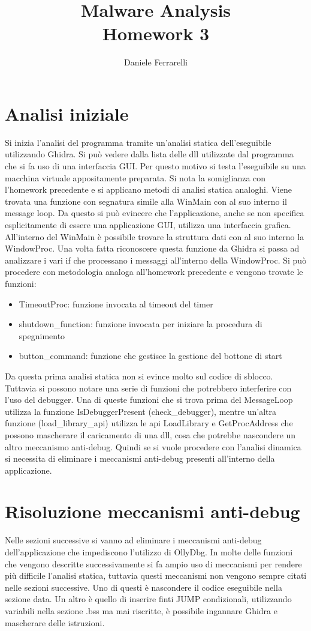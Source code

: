 \documentclass[a4paper,10pt]{article}
\title{Malware Analysis \\ \large Homework 3}
\author{Daniele Ferrarelli}
\date{}
\begin{document}
\maketitle

\section{Analisi iniziale}
Si inizia l'analisi del programma tramite un'analisi statica dell'eseguibile utilizzando Ghidra. Si può vedere  dalla lista delle dll utilizzate dal programma che si fa uso di una interfaccia GUI. Per questo motivo si testa l'eseguibile su una macchina virtuale appositamente preparata. Si nota la somiglianza con l'homework precedente e si applicano metodi di analisi statica analoghi. Viene trovata una funzione con segnatura simile alla WinMain con al suo interno il message loop. Da questo si può evincere che l'applicazione, anche se non specifica esplicitamente di essere una applicazione GUI, utilizza una interfaccia grafica. All'interno del WinMain è possibile trovare la struttura dati con al suo interno la WindowProc. Una volta fatta riconoscere questa funzione da Ghidra si passa ad analizzare i vari if che processano i messaggi all'interno della WindowProc. Si può procedere con metodologia analoga all'homework precedente e vengono trovate le funzioni:
\begin{itemize}
\item TimeoutProc: funzione invocata al timeout del timer
\item shutdown\_function: funzione invocata per iniziare la procedura di spegnimento
\item button\_command: funzione che gestisce la gestione del bottone di start
\end{itemize}
Da questa prima analisi statica non si evince molto sul codice di sblocco. Tuttavia si possono notare una serie di funzioni che potrebbero interferire con l'uso del debugger. Una di queste funzioni che si trova prima del MessageLoop utilizza la funzione IsDebuggerPresent (check\_debugger), mentre un'altra funzione (load\_library\_api) utilizza le api LoadLibrary e GetProcAddress che possono mascherare il caricamento di una dll, cosa che potrebbe nascondere un altro meccanismo anti-debug. Quindi se si vuole procedere con l'analisi dinamica si necessita di eliminare i meccanismi anti-debug presenti all'interno della applicazione. 

\section{Risoluzione meccanismi anti-debug}
Nelle sezioni successive si vanno ad eliminare i meccanismi anti-debug dell'applicazione che impediscono l'utilizzo di OllyDbg. In molte delle funzioni che vengono descritte successivamente si fa ampio uso di meccanismi per rendere più difficile l'analisi statica, tuttavia questi meccanismi non vengono sempre citati nelle sezioni successive. Uno di questi è nascondere il codice eseguibile nella sezione data. Un altro è quello di inserire finti JUMP condizionali, utilizzando variabili nella sezione .bss ma mai riscritte, è possibile ingannare Ghidra e mascherare delle istruzioni.
\end{document}
